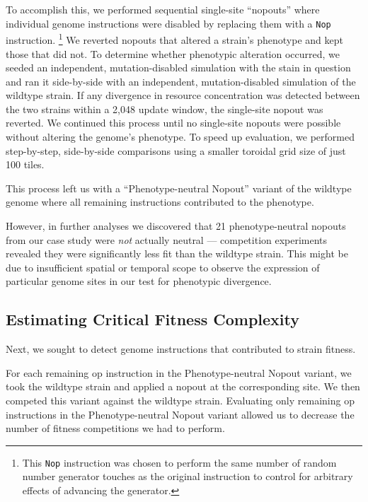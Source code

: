 To accomplish this, we performed sequential single-site ``nopouts'' where individual genome instructions were disabled by replacing them with a \texttt{Nop} instruction.
\footnote{
This \texttt{Nop} instruction was chosen to perform the same number of random number generator touches as the original instruction to control for arbitrary effects of advancing the generator.
}
We reverted nopouts that altered a strain's phenotype and kept those that did not.
To determine whether phenotypic alteration occurred, we seeded an independent, mutation-disabled simulation with the stain in question and ran it side-by-side with an independent, mutation-disabled simulation of the wildtype strain.
If any divergence in resource concentration was detected between the two strains within a 2,048 update window, the single-site nopout was reverted.
We continued this process until no single-site nopouts were possible without altering the genome's phenotype.
To speed up evaluation, we performed step-by-step, side-by-side comparisons using a smaller toroidal grid size of just 100 tiles.

This process left us with a ``Phenotype-neutral Nopout'' variant of the wildtype genome where all remaining instructions contributed to the phenotype.

However, in further analyses we discovered that 21 phenotype-neutral nopouts from our case study were \textit{not} actually neutral --- competition experiments revealed they were significantly less fit than the wildtype strain.
This might be due to insufficient spatial or temporal scope to observe the expression of particular genome sites in our test for phenotypic divergence.

\subsection{Estimating Critical Fitness Complexity}

Next, we sought to detect genome instructions that contributed to strain fitness.

For each remaining op instruction in the Phenotype-neutral Nopout variant, we took the wildtype strain and applied a nopout at the corresponding site.
We then competed this variant against the wildtype strain.
Evaluating only remaining op instructions in the Phenotype-neutral Nopout variant allowed us to decrease the number of fitness competitions we had to perform.

